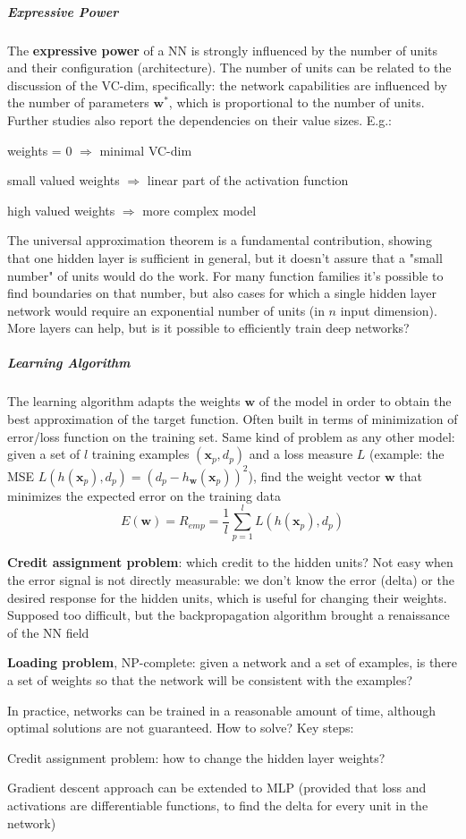 \documentclass[10pt]{report}
\begin{document}
\subparagraph{Expressive Power}
The \textbf{expressive power} of a NN is strongly influenced by the number of units and their configuration (architecture). The number of units can be related to the discussion of the VC-dim, specifically: the network capabilities are influenced by the number of parameters $\mathbf{w}^*$, which is proportional to the number of units. Further studies also report the dependencies on their value sizes. E.g.:
\begin{list}{}{}
	\item weights = 0 $\Rightarrow$ minimal VC-dim
	\item small valued weights $\Rightarrow$ linear part of the activation function
	\item high valued weights $\Rightarrow$ more complex model
\end{list}
The universal approximation theorem is a fundamental contribution, showing that one hidden layer is sufficient in general, but it doesn't assure that a "small number" of units would do the work. For many function families it's possible to find boundaries on that number, but also cases for which a single hidden layer network would require an exponential number of units (in $n$ input dimension).\\
More layers can help, but is it possible to efficiently train deep networks?
\subparagraph{Learning Algorithm} The learning algorithm adapts the weights $\mathbf{w}$ of the model in order to obtain the best approximation of the target function. Often built in terms of minimization of error/loss function on the training set. Same kind of problem as any other model: given a set of $l$ training examples $(\mathbf{x}_p, d_p)$ and a loss measure $L$ (example: the MSE $L(h(\mathbf{x}_p), d_p) = (d_p - h_\mathbf{w}(\mathbf{x}_p))^2$), find the weight vector $\mathbf{w}$ that minimizes the expected error on the training data $$E(\mathbf{w}) = R_{emp} = \frac{1}{l}\sum_{p=1}^l L(h(\mathbf{x}_p), d_p)$$
\begin{list}{}{}
	\item \textbf{Credit assignment problem}: which credit to the hidden units? Not easy when the error signal is not directly measurable: we don't know the error (delta) or the desired response for the hidden units, which is useful for changing their weights. Supposed too difficult, but the backpropagation algorithm brought a renaissance of the NN field
	\item \textbf{Loading problem}, NP-complete: given a network and a set of examples, is there a set of weights so that the network will be consistent with the examples?
\end{list}
In practice, networks can be trained in a reasonable amount of time, although optimal solutions are not guaranteed. How to solve? Key steps:
\begin{list}{}{}
	\item Credit assignment problem: how to change the hidden layer weights?
	\item Gradient descent approach can be extended to MLP (provided that loss and activations are differentiable functions, to find the delta for every unit in the network)
\end{list}
\pagebreak
\end{document}
